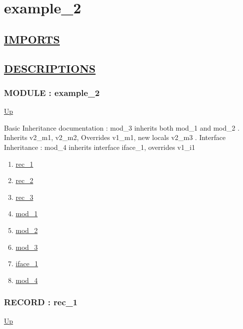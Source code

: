 \chapter*{example\_2}
\hypertarget{ecldoc:toc:example_2}{}

\section*{\underline{IMPORTS}}

\section*{\underline{DESCRIPTIONS}}
\subsection*{MODULE : example\_2}
\hypertarget{ecldoc:example_2}{}
\par
\begin{minipage}[t]{\textwidth}
\begin{flushleft}
  
\end{flushleft}
\end{minipage}
\hyperlink{ecldoc:toc:root}{Up} \\
\par
Basic Inheritance documentation : mod\_3 inherits both mod\_1 and mod\_2 . Inherits v2\_m1, v2\_m2, Overrides v1\_m1, new locals v2\_m3 . Interface Inheritance : mod\_4 inherits interface iface\_1, overrides v1\_i1 \\
\par
\begin{enumerate}
\item \hyperlink{ecldoc:example_2.rec_1}{rec\_1}
\item \hyperlink{ecldoc:example_2.rec_2}{rec\_2}
\item \hyperlink{ecldoc:example_2.rec_3}{rec\_3}
\item \hyperlink{ecldoc:example_2.mod_1}{mod\_1}
\item \hyperlink{ecldoc:example_2.mod_2}{mod\_2}
\item \hyperlink{ecldoc:example_2.mod_3}{mod\_3}
\item \hyperlink{ecldoc:example_2.iface_1}{iface\_1}
\item \hyperlink{ecldoc:example_2.mod_4}{mod\_4}
\end{enumerate}
\subsection*{RECORD : rec\_1}
\hypertarget{ecldoc:example_2.rec_1}{}
\par
\begin{minipage}[t]{\textwidth}
\begin{flushleft}
  
\end{flushleft}
\end{minipage}
\hyperlink{ecldoc:example_2}{Up} \\
\par
\par
